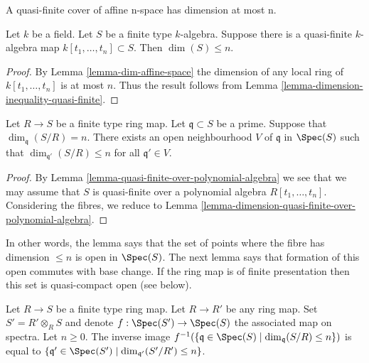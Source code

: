 \begin{lemma}
\label{lemma-dimension-quasi-finite-over-polynomial-algebra}
\begin{slogan}
A quasi-finite cover of affine n-space has dimension at most n.
\end{slogan}
Let $k$ be a field. Let $S$ be a finite type $k$-algebra.
Suppose there is a quasi-finite $k$-algebra map
$k[t_1, \ldots, t_n] \subset S$. Then $\dim(S) \leq n$.
\end{lemma}

\begin{proof}
By Lemma \ref{lemma-dim-affine-space} the dimension of
any local ring of $k[t_1, \ldots, t_n]$ is at most $n$.
Thus the result follows from
Lemma \ref{lemma-dimension-inequality-quasi-finite}.
\end{proof}

\begin{lemma}
\label{lemma-dimension-fibres-bounded-open-upstairs}
Let $R \to S$ be a finite type ring map.
Let $\mathfrak q \subset S$ be a prime.
Suppose that $\dim_{\mathfrak q}(S/R) = n$.
There exists an open neighbourhood $V$ of $\mathfrak q$
in $\Spec(S)$ such that
$\dim_{\mathfrak q'}(S/R) \leq n$ for all $\mathfrak q' \in V$.
\end{lemma}

\begin{proof}
By Lemma \ref{lemma-quasi-finite-over-polynomial-algebra}
we see that we may assume that $S$ is quasi-finite over
a polynomial algebra $R[t_1, \ldots, t_n]$. Considering
the fibres, we reduce to
Lemma \ref{lemma-dimension-quasi-finite-over-polynomial-algebra}.
\end{proof}

\noindent
In other words, the lemma says that the set of points where the
fibre has dimension $\leq n$ is open in $\Spec(S)$.
The next lemma says that formation of this open commutes with
base change.
If the ring map is of finite presentation then this set is
quasi-compact open (see below).

\begin{lemma}
\label{lemma-dimension-fibres-bounded-open-upstairs-base-change}
Let $R \to S$ be a finite type ring map.
Let $R \to R'$ be any ring map.
Set $S' = R' \otimes_R S$ and denote $f : \Spec(S') \to \Spec(S)$
the associated map on spectra.
Let $n \geq 0$.
The inverse image
$f^{-1}(\{\mathfrak q \in \Spec(S) \mid
\dim_{\mathfrak q}(S/R) \leq n\})$
is equal to
$\{\mathfrak q' \in \Spec(S') \mid
\dim_{\mathfrak q'}(S'/R') \leq n\}$.
\end{lemma}

